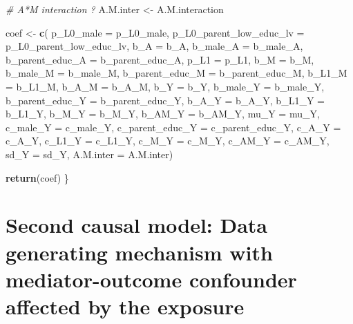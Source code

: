 \documentclass[
]{book}
\newenvironment{Shaded}{\begin{snugshade}}{\end{snugshade}}
\newcommand{\AttributeTok}[1]{\textcolor[rgb]{0.13,0.29,0.53}{#1}}
\newcommand{\CommentTok}[1]{\textcolor[rgb]{0.56,0.35,0.01}{\textit{#1}}}
\newcommand{\FunctionTok}[1]{\textcolor[rgb]{0.13,0.29,0.53}{\textbf{#1}}}
\newcommand{\NormalTok}[1]{#1}
\newcommand{\OtherTok}[1]{\textcolor[rgb]{0.56,0.35,0.01}{#1}}
\begin{document}
\begin{Shaded}
\begin{Highlighting}[]
\CommentTok{\# A*M interaction ?}
\NormalTok{A.M.inter }\OtherTok{\textless{}{-}}\NormalTok{ A.M.interaction}

\NormalTok{coef }\OtherTok{\textless{}{-}} \FunctionTok{c}\NormalTok{( }\AttributeTok{p\_L0\_male =}\NormalTok{ p\_L0\_male, }\AttributeTok{p\_L0\_parent\_low\_educ\_lv =}\NormalTok{ p\_L0\_parent\_low\_educ\_lv, }
           \AttributeTok{b\_A =}\NormalTok{ b\_A, }\AttributeTok{b\_male\_A =}\NormalTok{ b\_male\_A, }\AttributeTok{b\_parent\_educ\_A =}\NormalTok{ b\_parent\_educ\_A, }
           \AttributeTok{p\_L1 =}\NormalTok{ p\_L1,}
           \AttributeTok{b\_M =}\NormalTok{ b\_M, }\AttributeTok{b\_male\_M =}\NormalTok{ b\_male\_M, }\AttributeTok{b\_parent\_educ\_M =}\NormalTok{ b\_parent\_educ\_M, }
            \AttributeTok{b\_L1\_M =}\NormalTok{ b\_L1\_M, }\AttributeTok{b\_A\_M =}\NormalTok{ b\_A\_M,}
           \AttributeTok{b\_Y =}\NormalTok{ b\_Y, }\AttributeTok{b\_male\_Y =}\NormalTok{ b\_male\_Y, }\AttributeTok{b\_parent\_educ\_Y =}\NormalTok{ b\_parent\_educ\_Y, }
            \AttributeTok{b\_A\_Y =}\NormalTok{ b\_A\_Y, }\AttributeTok{b\_L1\_Y =}\NormalTok{ b\_L1\_Y, }\AttributeTok{b\_M\_Y =}\NormalTok{ b\_M\_Y, }\AttributeTok{b\_AM\_Y =}\NormalTok{ b\_AM\_Y,}
           \AttributeTok{mu\_Y =}\NormalTok{ mu\_Y, }\AttributeTok{c\_male\_Y =}\NormalTok{ c\_male\_Y, }\AttributeTok{c\_parent\_educ\_Y =}\NormalTok{ c\_parent\_educ\_Y, }
            \AttributeTok{c\_A\_Y =}\NormalTok{ c\_A\_Y, }\AttributeTok{c\_L1\_Y =}\NormalTok{ c\_L1\_Y, }\AttributeTok{c\_M\_Y =}\NormalTok{ c\_M\_Y, }\AttributeTok{c\_AM\_Y =}\NormalTok{ c\_AM\_Y, }
           \AttributeTok{sd\_Y =}\NormalTok{ sd\_Y, }\AttributeTok{A.M.inter =}\NormalTok{ A.M.inter)}
  
\FunctionTok{return}\NormalTok{(coef)}
\NormalTok{\}}
\end{Highlighting}
\end{Shaded}

\hypertarget{second-causal-model-data-generating-mechanism-with-mediator-outcome-confounder-affected-by-the-exposure}{%
\section{Second causal model: Data generating mechanism with mediator-outcome confounder affected by the exposure}\label{second-causal-model-data-generating-mechanism-with-mediator-outcome-confounder-affected-by-the-exposure}}
\end{document}
